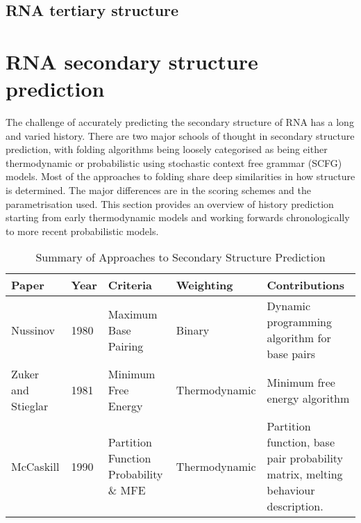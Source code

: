 \documentclass[journal]{IEEEtran}
\begin{document}
\subsection{RNA tertiary structure}
\label{subsec:intro-rna-ter-structure}

\section{RNA secondary structure prediction}
\label{sec:rna-secondary-structure}
The challenge of accurately predicting the secondary structure of RNA has a long and varied history. There are two major schools of thought in secondary structure prediction, with folding algorithms being loosely categorised as being either thermodynamic or probabilistic using stochastic context free grammar (SCFG) models. Most of the approaches to folding share deep similarities in how structure is determined. The major differences are in the scoring schemes and the parametrisation used. This section provides an overview of history prediction starting from early thermodynamic models and working forwards chronologically to more recent probabilistic models.

\begin{table*}[t]
\centering
\caption{Summary of Approaches to Secondary Structure Prediction}
\label{my-label}
\begin{tabular}{|l|l|l|l|p{5cm}|}
\hline
\textbf{Paper}                             & \textbf{Year} & \textbf{Criteria}                     & \textbf{Weighting} & \textbf{Contributions}                                                           \\ \hline
Nussinov \cite{nussinov1980fast}           & 1980          & Maximum Base Pairing                  & Binary             & Dynamic programming algorithm for base pairs                                     \\ \hline
Zuker and Stieglar \cite{zuker1981optimal} & 1981          & Minimum Free Energy                   & Thermodynamic      & Minimum free energy algorithm                                                    \\ \hline
McCaskill \cite{mccaskill1990equilibrium}  & 1990          & Partition Function Probability \& MFE & Thermodynamic      & Partition function, base pair probability matrix, melting behaviour description. \\ \hline
\end{tabular}
\end{table*}
\end{document}
